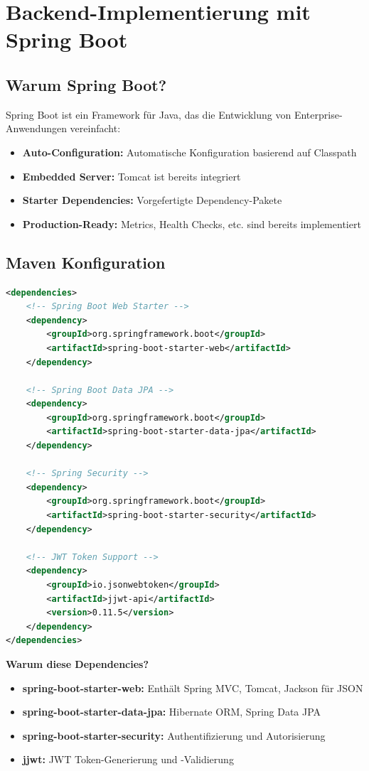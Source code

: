 \documentclass[a4paper,12pt]{article}
\begin{document}
\section{Backend-Implementierung mit Spring Boot}

\subsection{Warum Spring Boot?}

Spring Boot ist ein Framework für Java, das die Entwicklung von Enterprise-Anwendungen vereinfacht:

\begin{itemize}
    \item \textbf{Auto-Configuration:} Automatische Konfiguration basierend auf Classpath
    \item \textbf{Embedded Server:} Tomcat ist bereits integriert
    \item \textbf{Starter Dependencies:} Vorgefertigte Dependency-Pakete
    \item \textbf{Production-Ready:} Metrics, Health Checks, etc. sind bereits implementiert
\end{itemize}

\subsection{Maven Konfiguration}

\begin{lstlisting}[language=XML, caption=pom.xml - Maven Dependencies]
<dependencies>
    <!-- Spring Boot Web Starter -->
    <dependency>
        <groupId>org.springframework.boot</groupId>
        <artifactId>spring-boot-starter-web</artifactId>
    </dependency>

    <!-- Spring Boot Data JPA -->
    <dependency>
        <groupId>org.springframework.boot</groupId>
        <artifactId>spring-boot-starter-data-jpa</artifactId>
    </dependency>

    <!-- Spring Security -->
    <dependency>
        <groupId>org.springframework.boot</groupId>
        <artifactId>spring-boot-starter-security</artifactId>
    </dependency>

    <!-- JWT Token Support -->
    <dependency>
        <groupId>io.jsonwebtoken</groupId>
        <artifactId>jjwt-api</artifactId>
        <version>0.11.5</version>
    </dependency>
</dependencies>
\end{lstlisting}

\textbf{Warum diese Dependencies?}
\begin{itemize}
    \item \textbf{spring-boot-starter-web:} Enthält Spring MVC, Tomcat, Jackson für JSON
    \item \textbf{spring-boot-starter-data-jpa:} Hibernate ORM, Spring Data JPA
    \item \textbf{spring-boot-starter-security:} Authentifizierung und Autorisierung
    \item \textbf{jjwt:} JWT Token-Generierung und -Validierung
\end{itemize}
\end{document}
